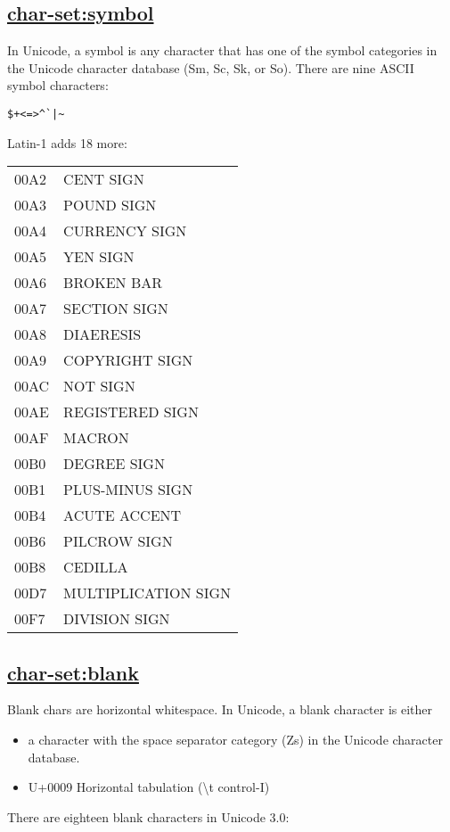 \subsection{\texorpdfstring{\href{}{char-set:symbol}}{char-set:symbol}}\label{char-setsymbol}

In Unicode, a symbol is any character that has one of the symbol
categories in the Unicode character database (Sm, Sc, Sk, or So). There
are nine ASCII symbol characters:

\begin{verbatim}
$+<=>^`|~
\end{verbatim}

Latin-1 adds 18 more:

\begin{longtable}[]{@{}ll@{}}
\toprule
00A2 & CENT SIGN\tabularnewline
00A3 & POUND SIGN\tabularnewline
00A4 & CURRENCY SIGN\tabularnewline
00A5 & YEN SIGN\tabularnewline
00A6 & BROKEN BAR\tabularnewline
00A7 & SECTION SIGN\tabularnewline
00A8 & DIAERESIS\tabularnewline
00A9 & COPYRIGHT SIGN\tabularnewline
00AC & NOT SIGN\tabularnewline
00AE & REGISTERED SIGN\tabularnewline
00AF & MACRON\tabularnewline
00B0 & DEGREE SIGN\tabularnewline
00B1 & PLUS-MINUS SIGN\tabularnewline
00B4 & ACUTE ACCENT\tabularnewline
00B6 & PILCROW SIGN\tabularnewline
00B8 & CEDILLA\tabularnewline
00D7 & MULTIPLICATION SIGN\tabularnewline
00F7 & DIVISION SIGN\tabularnewline
\bottomrule
\end{longtable}

\subsection{\texorpdfstring{\href{}{char-set:blank}}{char-set:blank}}\label{char-setblank}

Blank chars are horizontal whitespace. In Unicode, a blank character is
either

\begin{itemize}
\tightlist
\item
  a character with the space separator category (Zs) in the Unicode
  character database.
\item
  U+0009 Horizontal tabulation (\textbackslash{}t control-I)
\end{itemize}

There are eighteen blank characters in Unicode 3.0:

